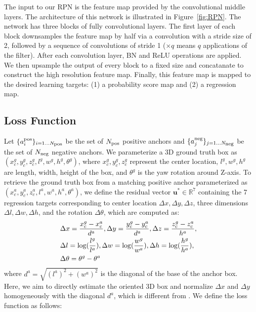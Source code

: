 \documentclass[10pt,twocolumn,letterpaper]{article}
\begin{document}
The input to our RPN is the feature map provided by the convolutional middle layers.  The architecture of this network is illustrated in Figure~\ref{fig:RPN}. The network has three blocks of fully convolutional layers. The first layer of each block downsamples the feature map by half via a convolution with a stride size of 2, followed by a sequence of convolutions of stride 1 ($\times q$ means $q$ applications of the filter). After each convolution layer, BN and ReLU operations are applied. We then upsample the output of every block to a fixed size and concatanate to construct the high resolution feature map. Finally, this feature map is mapped to the desired learning targets: (1) a probability score map and (2) a regression map. 




\subsection{Loss Function}

Let $\{ a^{\text{\scriptsize pos}}_i \}_{i=1 \ldots N_{\text{\scriptsize pos}}}$ be the set of $N_{\text{\scriptsize pos}}$ positive anchors and $\{ a^{\text{\scriptsize neg}}_j \}_{j=1 \ldots N_{\text{\scriptsize neg}}}$ be the set of $N_{\text{\scriptsize neg}}$ negative anchors. We parameterize a 3D ground truth box as $(x_c^g, y_c^g, z_c^g, l^g, w^g, h^g, \theta^g)$, where $x_c^g, y_c^g, z_c^g$ represent the center location, $l^g, w^g, h^g$ are length, width, height of the box, and $\theta^g$ is the yaw rotation around Z-axis. To retrieve the ground truth box from a matching positive anchor parameterized as $(x_c^a, y_c^a, z_c^a, l^a, w^a, h^a, \theta^a)$, we define the residual vector $\mathbf{u}^* \in \mathbb{R}^7$  containing the 7 regression targets corresponding to center location $\Delta x, \Delta y, \Delta z$, three dimensions $\Delta l, \Delta w, \Delta h$, and the rotation $\Delta \theta$, which are computed as:
\begin{align}
\scriptsize
    &\Delta x = \frac{x_c^g - x_c^a}{d^a} , \Delta y = \frac{y_c^g - y_c^a}{d^a} , 
    \Delta z = \frac{z_c^g - z_c^a}{h^a} , \nonumber \\
    &\Delta l = \log(\frac{l^g}{l^a}) , \Delta w = \log(\frac{w^g}{w^a}) , \Delta h = \log(\frac{h^g}{h^a}) , \\
    &\Delta \theta = \theta^g - \theta^a \nonumber
\label{eqn:reg_targets}
\end{align}
where $d^a = \sqrt{(l^a)^2 + (w^a)^2}$ is the diagonal of the base of the anchor box. Here, we aim to directly estimate the oriented 3D box and normalize $\Delta x$ and $\Delta y$ homogeneously with the diagonal $d^a$, which is different from \cite{REF:NIPS2015_5638,REF:DeepSlidingShapes,REF:VeloFCN, REF:3DFCN,REF:nips15chen,REF:cvpr16chen,REF:cvpr17chen}. We define the loss function as follows:
\end{document}
